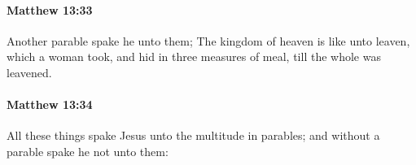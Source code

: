 		\paragraph{Matthew 13:33} %
			\label{MATTHEW-13-33}

			Another parable spake he unto them; The kingdom of heaven is like unto leaven, which a woman took, and hid in three measures of meal, till the whole was leavened.

			\begin{framed}
			\scriptsize
				\begin{compactdesc}
					\item[SBLG] 
				\end{compactdesc}
			\end{framed}

		\paragraph{Matthew 13:34} %
			\label{MATTHEW-13-34}

			All these things spake Jesus unto the multitude in parables; and without a parable spake he not unto them:

